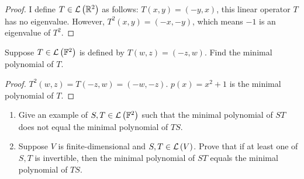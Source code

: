 \begin{proof}
    I define $T\in\mathcal{L}\left({\mathbb{R}^{2}}\right)$ as follows: $T(x, y) = (-y, x)$, this linear operator $T$ has no eigenvalue. However, $T^{2}(x, y) = (-x, -y)$, which means $-1$ is an eigenvalue of $T^{2}$.
\end{proof}
\newpage

\begin{exercise}
    Suppose $T \in \mathcal{L}\left({\mathbb{F}^{2}}\right)$ is defined by $T(w, z) = (-z, w)$. Find the minimal polynomial of $T$.
\end{exercise}

\begin{proof}
    $T^{2}(w, z) = T(-z, w) = (-w, -z)$. $p(x) = x^{2} + 1$ is the minimal polynomial of $T$.
\end{proof}
\newpage

\begin{exercise}
    \begin{enumerate}[label={(\alph*)}]
        \item Give an example of $S, T\in\mathcal{L}\left({\mathbb{F}^{2}}\right)$ such that the minimal polynomial of $ST$ does not equal the minimal polynomial of $TS$.
        \item Suppose $V$ is finite-dimensional and $S,T \in \mathcal{L}\left({V}\right)$. Prove that if at least one of $S, T$ is invertible, then the minimal polynomial of $ST$ equals the minimal polynomial of $TS$.
    \end{enumerate}
\end{exercise}

